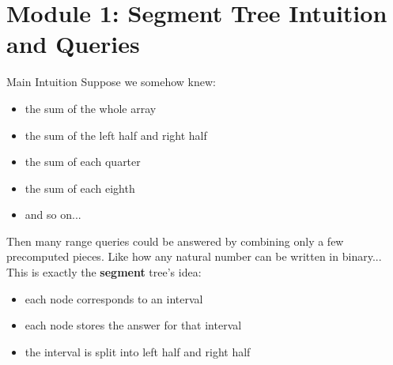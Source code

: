 \documentclass[aspectratio=169]{beamer}
\begin{document}

\section{Module 1: Segment Tree Intuition and Queries}

\begin{frame}{Main Intuition}
    Suppose we somehow knew:
    \begin{itemize}
        \item the sum of the whole array
        \item the sum of the left half and right half
        \item the sum of each quarter
        \item the sum of each eighth
        \item and so on...
    \end{itemize}

    Then many range queries could be answered by combining only a few precomputed pieces. Like how any natural number can be written in binary... This is exactly the \textbf{segment} tree's idea:
    \begin{itemize}
        \item each node corresponds to an interval
        \item each node stores the answer for that interval
        \item the interval is split into left half and right half
    \end{itemize}
\end{frame}
\end{document}
